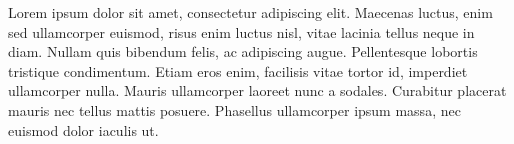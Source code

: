 \documentclass[12pt,article]{IEEEtran}
\begin{document}

Lorem ipsum dolor sit amet, consectetur adipiscing elit. Maecenas luctus, enim sed ullamcorper euismod, risus enim luctus nisl, vitae lacinia tellus neque in diam. Nullam quis bibendum felis, ac adipiscing augue. Pellentesque lobortis tristique condimentum. Etiam eros enim, facilisis vitae tortor id, imperdiet ullamcorper nulla. Mauris ullamcorper laoreet nunc a sodales. Curabitur placerat mauris nec tellus mattis posuere. Phasellus ullamcorper ipsum massa, nec euismod dolor iaculis ut.
\end{document}

